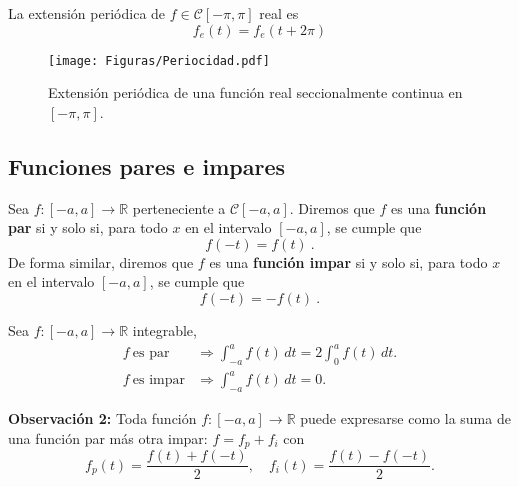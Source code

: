 \begin{ejemplo}
La extensión periódica de $f \in \mathscr{C}[-\pi,\pi]$ real es
$$f_e(t) = f_e(t + 2\pi)$$

\begin{figure}[H]
    \centering
    \texttt{[image: Figuras/Periocidad.pdf]}
    \caption{Extensión periódica de una función real seccionalmente continua en $[-\pi,\pi]$.}
\end{figure}
\end{ejemplo}

\subsection{Funciones pares e impares}
 
\begin{defi}
Sea $f: [-a,a] \longrightarrow \mathbb{R}$ perteneciente a $\mathscr{C}[-a,a]$.
Diremos que $f$ es una \textbf{función par} si y solo si, para todo $x$ en el intervalo $[-a,a]$, se cumple que
\begin{equation}
    f(-t) = f(t) \ .
\end{equation}
De forma similar, diremos que $f$ es una \textbf{función impar} si y solo si, para todo $x$ en el intervalo $[-a,a]$, se cumple que
\vspace{-0.1cm}
\begin{equation}
     f(-t) = -f(t) \ .
\end{equation}
\end{defi} 


\begin{propo}
    Sea $f: [-a,a] \longrightarrow \mathbb{R}$ integrable,
    \begin{align*}
        f ~\mbox{es par} &\Rightarrow \int_{-a}^a f(t) \,dt = 2 \int_0^a f(t) \,dt. \\
        f ~\mbox{es impar} &\Rightarrow \int_{-a}^a f(t) \,dt = 0.
    \end{align*}
\end{propo}

\textbf{Observación 2:} Toda función $f:[-a,a] \longrightarrow \mathbb{R}$ puede expresarse como la suma de una función par más otra impar: $f = f_p + f_i$ con 
$$f_p(t) = \frac{f(t) + f(-t)}{2}, \quad f_i(t) = \frac{f(t) - f(-t)}{2}.$$

